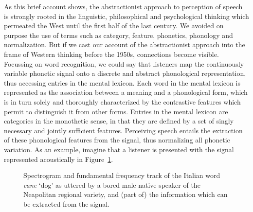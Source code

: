As this brief account shows, the abstractionist approach to perception of speech is strongly rooted in the linguistic, philosophical and psychological thinking which permeated the West until the first half of the last century. We avoided on purpose the use of terms such as category, feature, phonetics, phonology and normalization. But if we cast our account of the abstractionist approach into the frame of Western thinking before the 1950s, connections become visible. Focussing on word recognition, we could say that listeners map the continuously variable phonetic signal onto a discrete and abstract phonological representation, thus accessing entries in the mental lexicon. Each word in the mental lexicon is represented as the association between a meaning and a phonological form, which is in turn solely and thoroughly characterized by the contrastive features which permit to distinguish it from other forms. Entries in the mental lexicon are categories in the monothetic sense, in that they are defined by a set of singly necessary and jointly sufficient features. Perceiving speech entails the extraction of these phonological features from the signal, thus normalizing all phonetic variation. As an example, imagine that a listener is presented with the signal represented acoustically in Figure~\ref{fig101}. 

\begin{figure}[t]
\centering
{}
\caption{Spectrogram and fundamental frequency track of the Italian word \textit{cane} `dog' as uttered by a bored male native speaker of the Neapolitan regional variety, and (part of) the information which can be extracted from the signal.}
\label{fig101}\end{figure}

